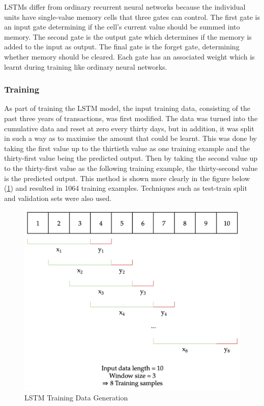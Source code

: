 LSTMs differ from ordinary recurrent neural networks because the individual units have single-value memory cells that three gates can control. The first gate is an input gate determining if the cell's current value should be summed into memory. The second gate is the output gate which determines if the memory is added to the input as output. The final gate is the forget gate, determining whether memory should be cleared. Each gate has an associated weight which is learnt during training like ordinary neural networks.

\subsubsection{Training}
As part of training the LSTM model, the input training data, consisting of the past three years of transactions, was first modified. The data was turned into the cumulative data and reset at zero every thirty days, but in addition, it was split in such a way as to maximise the amount that could be learnt. This was done by taking the first value up to the thirtieth value as one training example and the thirty-first value being the predicted output. Then by taking the second value up to the thirty-first value as the following training example, the thirty-second value is the predicted output. This method is shown more clearly in the figure below (\ref{fig:TrainingData}) and resulted in 1064 training examples. Techniques such as test-train split and validation sets were also used.

\begin{figure}[H]
	\centering
	\includegraphics[width=\textwidth]{images/rnn_sample_generation.png}
	\caption{LSTM Training Data Generation}
	\label{fig:TrainingData}
\end{figure}

